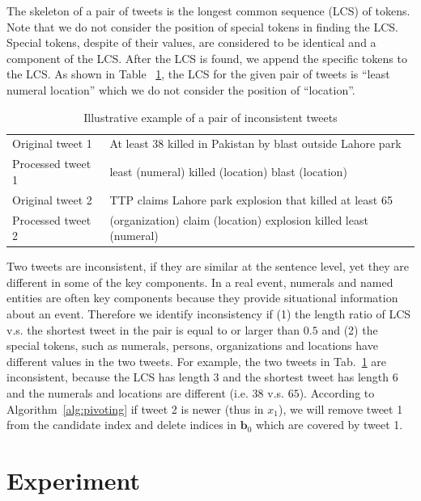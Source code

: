 \documentclass[runningheads]{llncs}
\begin{document}
The skeleton of a pair of tweets is the longest common sequence (LCS) of tokens. Note that we do not consider the position of special tokens in finding the LCS. Special tokens, despite of their values, are considered to be identical and a component of the LCS. After the LCS is found, we append the specific tokens to the LCS. As shown in Table ~\ref{tab:example}, the LCS for the given pair of tweets is ``least numeral location'' which we do not consider the position of ``location''.

\vspace{-0.6cm}
\begin{table}
\caption{Illustrative example of a pair of inconsistent tweets}\label{tab:example}
\begin{tabular}{|l|l|}
\hline
Original tweet 1 & At least 38 killed in Pakistan by blast outside Lahore park \\
Processed tweet 1  & least (numeral) killed  (location) blast  (location)\\\hline
Original tweet 2 & TTP claims Lahore park explosion that killed at least 65 \\
Processed tweet 2& (organization) claim (location) explosion killed least (numeral)\\\hline
\end{tabular}
\end{table}
\vspace{-0.6cm}

Two tweets are inconsistent, if they are similar at the sentence level, yet they are different in some of the key components. In a real event, numerals and named entities are often key components because they provide situational information about an event. Therefore we identify inconsistency if (1) the length ratio of LCS v.s. the shortest tweet in the pair is equal to or larger than $0.5$ and (2) the special tokens, such as numerals, persons, organizations and locations have different values in the two tweets. For example, the two tweets in Tab.~\ref{tab:example} are inconsistent, because the LCS has length $3$ and the shortest tweet has length $6$ and the numerals and locations are different (i.e. $38$ v.s. $65$). According to Algorithm~\ref{alg:pivoting} if tweet 2 is newer (thus in $x_1$), we will remove tweet 1 from the candidate index and delete indices in $\mathbf{b}_0$ which are covered by tweet 1.

\section{Experiment}\label{sec:experiment}
\end{document}
